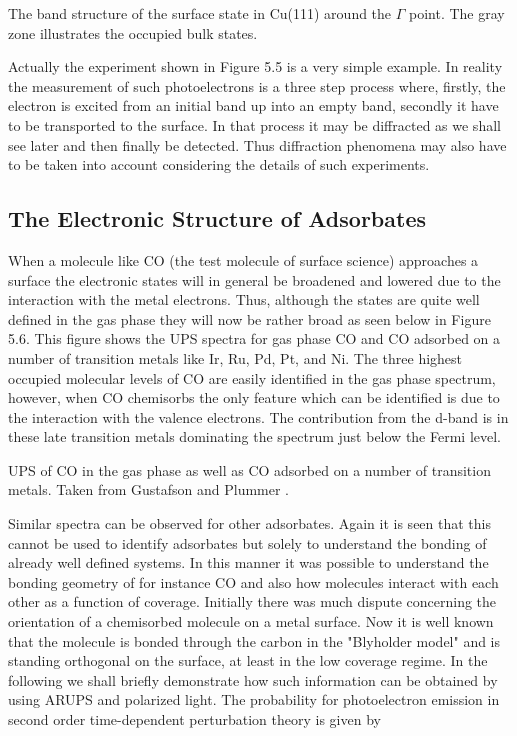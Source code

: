 \vspace*{11cm}

           The band structure of the surface state in Cu(111) around the $\Gamma$ point. The gray zone illustrates the occupied bulk states.

\vspace{1cm}

Actually the experiment shown in Figure 5.5 is a very simple example. In reality the measurement of such photoelectrons is a three step process  \cite{Berglund} where, firstly, the electron is excited from an initial band up into an empty band, secondly it have to be transported to the surface. In that process it may be diffracted as we shall see later and then  finally be detected. Thus diffraction phenomena may also have to be taken into account considering the details of such experiments.

\subsection{The Electronic Structure of Adsorbates}
When a molecule like CO (the test molecule of surface science) approaches a surface the electronic states will in general be broadened and lowered due to the interaction with the metal electrons. Thus, although the states are quite well defined in the gas phase they will now be rather broad as seen below in Figure 5.6. This figure shows the UPS spectra for gas phase CO and CO adsorbed on a number of transition metals like Ir, Ru, Pd, Pt, and Ni. The three highest occupied molecular levels of CO are easily identified in the gas phase spectrum, however, when CO chemisorbs the only feature which can be identified is due to the interaction with the valence electrons.  The contribution from the d-band is  in these late transition metals dominating the spectrum just below the Fermi level.

\vspace*{11cm}

           UPS of CO in the gas phase as well as CO adsorbed on a number of transition metals. Taken from Gustafson and Plummer \cite{Gustafson}.

\vspace{1cm}



Similar spectra can be observed for other adsorbates. Again it is seen that this cannot be used to identify adsorbates but solely to understand the bonding of already well defined systems. In this manner it was possible to understand the bonding geometry of for instance CO and also how molecules interact with each other as a function of coverage. Initially there was much dispute concerning the orientation of a chemisorbed molecule on a metal surface. Now it is well known that the molecule is bonded through the carbon in the "Blyholder  model"  and is standing orthogonal on the surface, at least in the low coverage regime. In the following we shall briefly demonstrate how such information can be obtained by using ARUPS and polarized light. The probability for photoelectron emission in second order time-dependent perturbation theory is given by

